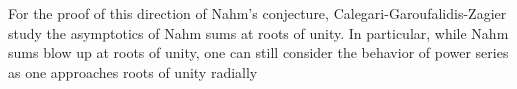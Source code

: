 For the proof of this direction of Nahm's conjecture, Calegari-Garoufalidis-Zagier study the asymptotics of Nahm sums at roots of unity. In particular, while Nahm sums blow up at roots of unity, one can still consider the behavior of power series as one approaches roots of unity radially
\begin{figure}[h]\label{fig: approaching roots of unity radially}
    



    


\begin{tikzpicture}[x=0.75pt,y=0.75pt,yscale=-1,xscale=1]


\end{tikzpicture}
\end{figure}
